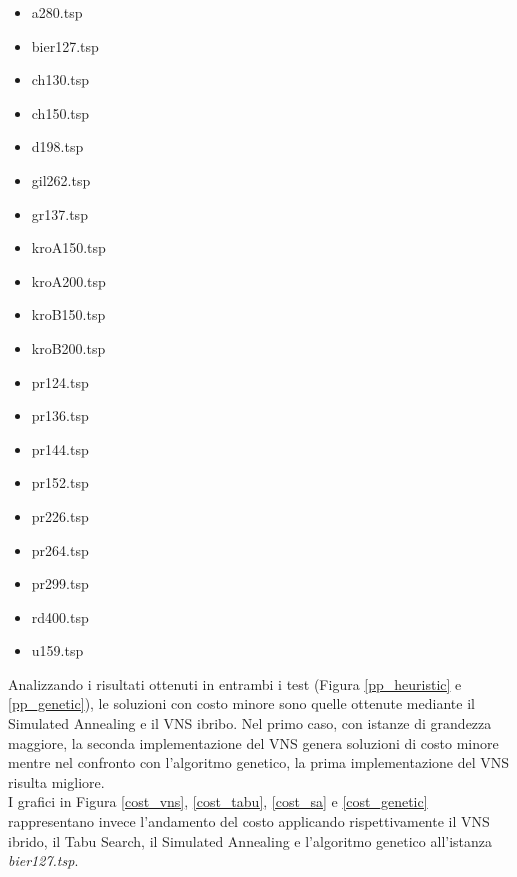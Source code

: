 \begin{center}
\begin{multicols}{3}
\begin{itemize}
\item{a280.tsp}
\item{bier127.tsp}
\item{ch130.tsp}
\item{ch150.tsp}
\item{d198.tsp}
\item{gil262.tsp}
\item{gr137.tsp}
\item{kroA150.tsp}
\item{kroA200.tsp}
\item{kroB150.tsp}
\item{kroB200.tsp}
\item{pr124.tsp}
\item{pr136.tsp}
\item{pr144.tsp}
\item{pr152.tsp}
\item{pr226.tsp}
\item{pr264.tsp}
\item{pr299.tsp}
\item{rd400.tsp}
\item{u159.tsp}
\end{itemize}
\end{multicols}
\end{center}
Analizzando i risultati ottenuti in entrambi i test (Figura \ref{pp_heuristic} e \ref{pp_genetic}), le soluzioni con costo minore sono quelle ottenute mediante il Simulated Annealing e il VNS ibribo. Nel primo caso, con istanze di grandezza maggiore, la seconda implementazione del VNS genera soluzioni di costo minore mentre nel confronto con l'algoritmo genetico, la prima implementazione del VNS risulta migliore.\\
I grafici in Figura \ref{cost_vns}, \ref{cost_tabu}, \ref{cost_sa} e \ref{cost_genetic} rappresentano invece l'andamento del costo applicando rispettivamente il VNS ibrido, il Tabu Search, il Simulated Annealing e l'algoritmo genetico all'istanza \textit{bier127.tsp}.

